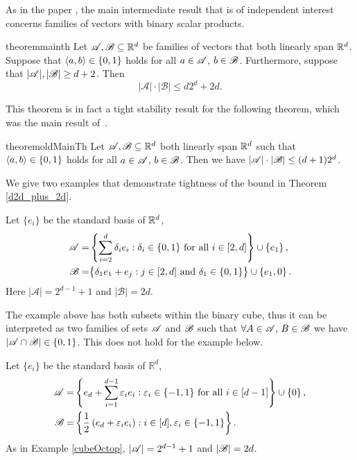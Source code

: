 \noindent As in the paper \cite{kupavskii22}, the main intermediate result that is of independent interest concerns families of vectors with binary scalar products.

\begin{restatable}[]{theorem}{mainth}\label{d2d_plus_2d}
     Let ${\mathscr{A}},{\mathscr{B}} \subseteq {\mathbb{R}}^d$ be families of vectors that both linearly span ${\mathbb{R}}^d$. Suppose that $\langle a, b\rangle \in \{0,1\}$ holds for all $a \in {\mathscr{A}}$, $b \in {\mathscr{B}}$. Furthermore, suppose that $|{\mathscr{A}}|,|{\mathscr{B}}|\ge d+2$. Then \begin{equation}\label{eqmainvec}\left|\mathcal{A}\right| \cdot\left|\mathcal{B}\right| \leq d 2^d + 2d.\end{equation}
\end{restatable}

\noindent This theorem is in fact a tight stability result for the following theorem, which was the main result of~\cite{kupavskii22}.

\begin{restatable}{theorem}{oldMainTh}
    \label{d_plus_one_two_d}
    Let ${\mathscr{A}},{\mathscr{B}} \subseteq {\mathbb{R}}^d$ both linearly span ${\mathbb{R}}^d$ such that $\langle a, b\rangle \in \{0,1\}$ holds for all $a \in {\mathscr{A}}$, $b \in {\mathscr{B}}$.
    Then we have $|{\mathscr{A}}| \cdot |{\mathscr{B}}| \le (d+1) 2^d$.
\end{restatable}

\noindent We give two examples that demonstrate tightness of the bound in Theorem \ref{d2d_plus_2d}.

\begin{example}\label{cubeOctop}
    Let $\{e_i\}$ be the standard basis of ${\mathbb{R}}^d$, 
    \begin{align*}
        {\mathscr{A}}=&\left\{\sum_{i=2}^{d}\delta_i e_i: \delta_i\in \{0,1\} \text{ for all }i\in [2,d]\right\}\cup\left\{e_1\right\},\\ 
        {\mathscr{B}}=&\big\{\delta_1 e_1 + e_j: j\in [2,d] \text{ and }\delta_1\in \{0,1\}\big\} \cup \left\{e_1, 0\right\}.
    \end{align*}
    Here $\left|\mathcal{A}\right|=2^{d-1}+1$ and $\left|\mathcal{B}\right|=2d$.
\end{example}
The example above has both subsets within the binary cube, thus it can be interpreted as two families of sets ${\mathscr{A}}$ and ${\mathscr{B}}$ such that $\forall A\in {\mathscr{A}},\,B\in{\mathscr{B}}$ we have $|{\mathscr{A}}\cap{\mathscr{B}}|\in\{0,1\}$. This does not hold for the example below.
\begin{example}\label{crosspoly}
    Let $\{e_i\}$ be the standard basis of $\mathbb{R}^d$,
    \begin{align*}
        {\mathscr{A}}=&\left\{e_d+\sum_{i=1}^{d-1}\varepsilon_i e_i: {\varepsilon}_i \in \{-1,1\} \text{ for all }i\in [d-1]\right\}\cup\left\{0\right\},\\
        {\mathscr{B}}=&\left\{\frac{1}{2}\left(e_d+\varepsilon_i e_i\right): i\in [d], {\varepsilon}_i\in \{-1,1\}\right\}.
    \end{align*}
    As in Example \ref{cubeOctop}, $\left|{\mathscr{A}}\right|=2^{d-1}+1$ and $\left|{\mathscr{B}}\right|=2d$.
\end{example}

